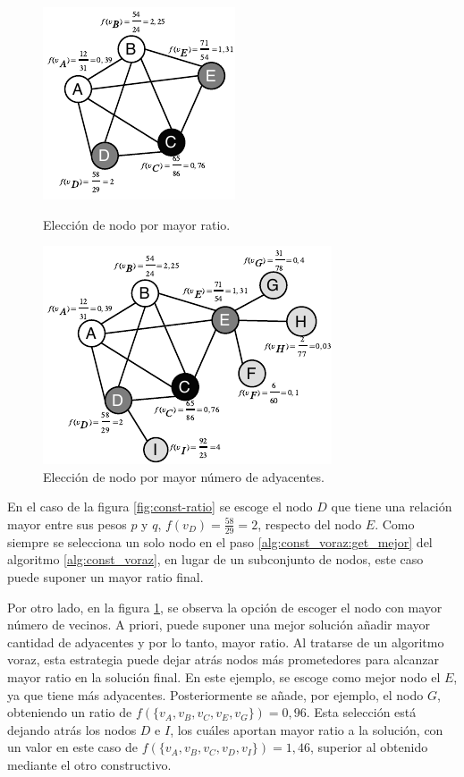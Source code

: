 \begin{figure}[H]
	\hspace{-1.5cm}
	\begin{minipage}[b]{0.55\linewidth}
		\centering
		\includegraphics[scale=1.6]{Figures/diag-const-ratio.pdf}
		\caption{\footnotesize Elección de nodo por mayor ratio.}
		\label{fig:const-ratio}
	\end{minipage}
	\hspace{-1cm}
	\begin{minipage}[b]{0.6\linewidth}
		\centering
		\includegraphics[scale=1.6]{Figures/diag-const-ady.pdf}
		\caption{\footnotesize Elección de nodo por mayor número de adyacentes.}
		\label{fig:const-ady}
	\end{minipage}
\end{figure}
En el caso de la figura \ref{fig:const-ratio} se escoge el nodo $D$ que tiene una relación mayor entre sus pesos $p$ y $q$, $f(v_D)=\frac{58}{29}=2$, respecto del nodo $E$. Como siempre se selecciona un solo nodo en el paso \ref{alg:const_voraz:get_mejor} del algoritmo \ref{alg:const_voraz}, en lugar de un subconjunto de nodos, este caso puede suponer un mayor ratio final.

Por otro lado, en la figura \ref{fig:const-ady}, se observa la opción de escoger el nodo con mayor número de vecinos. A priori, puede suponer una mejor solución añadir mayor cantidad de adyacentes y por lo tanto, mayor ratio. Al tratarse de un algoritmo voraz, esta estrategia puede dejar atrás nodos más prometedores para alcanzar mayor ratio en la solución final. En este ejemplo, se escoge como mejor nodo el $E$, ya que tiene más adyacentes. Posteriormente se añade, por ejemplo, el nodo $G$, obteniendo un ratio de $f(\{v_A,v_B,v_C,v_E,v_G\})=0,96$. Esta selección está dejando atrás los nodos $D$ e $I$, los cuáles aportan mayor ratio a la solución, con un valor en este caso de $f(\{v_A,v_B,v_C,v_D,v_I\})=1,46$, superior al obtenido mediante el otro constructivo.

